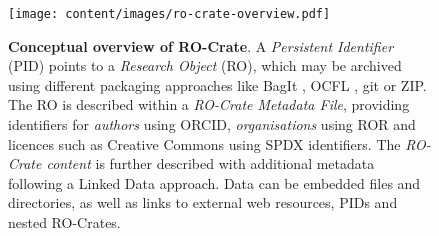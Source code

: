 \begin{figure}[t!]
    \centering
    \texttt{[image: content/images/ro-crate-overview.pdf]}
\caption{\textbf{Conceptual overview of RO-Crate}. A \emph{Persistent Identifier} (PID) \cite{doi:10.1371/journal.pbio.2001414} points to a \emph{Research Object} (RO), which may be archived using different packaging approaches like BagIt \cite{doi:10.17487/rfc8493}, OCFL \cite{ocfl_2020}, git or ZIP. The RO is described within a \emph{RO-Crate Metadata File}, providing identifiers for \emph{authors} using ORCID, \emph{organisations} using ROR \cite{doi:10.6087/kcse.192} and licences such as Creative Commons using SPDX identifiers. The \emph{RO-Crate content} is further described with additional metadata following a Linked Data approach. Data can be embedded files and directories, as well as links to external web resources, PIDs and nested RO-Crates.}
    \label{fig:conceptual}
\end{figure}
